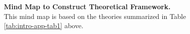 \begin{landscape}
\begin{longtable}{@{}lL{4.5cm}L{3.3cm}p{11.5cm}@{}}
 \bottomrule
\end{longtable}
\end{landscape}


\begin{figure}[H]
\caption[Mind Map to Construct Theoretical Framework]{\textbf{Mind Map to Construct Theoretical Framework.} \\This mind map is based on the theories summarized in Table \ref{tab:intro-app-tab1} above.}
\label{fig:intro-app-fig1}
\end{figure}

